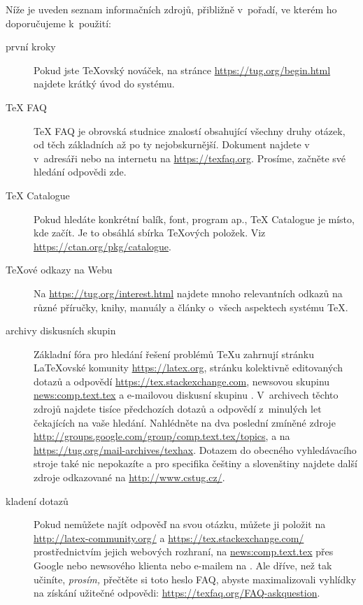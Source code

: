 \documentclass[\classoptions,slovak,english,czech]{\classname}
\newcommand{\ctt}{\url{news:comp.text.tex}}
\begin{document}
Níže je uveden seznam informačních zdrojů, přibližně v~pořadí, ve kterém
ho doporučujeme k~použití:
\begin{description}
\item [první kroky] Pokud jste \TeX ovský nováček, na stránce
\url{https://tug.org/begin.html} najdete krátký úvod do systému.
\item [\TeX{} FAQ] \TeX{} FAQ je obrovská studnice
  znalostí obsahující všechny druhy otázek, od těch základních až po 
  ty nejobskurnější. Dokument najdete v~\TL{} v~adresáři 
  nebo na internetu na \url{https://texfaq.org}.
  Prosíme, začněte své hledání odpovědi zde.

\item [\TeX{} Catalogue] Pokud hledáte konkrétní balík,
  font, program ap., \TeX{} Catalogue je místo, kde začít.
  Je to obsáhlá sbírka \TeX{}ových položek. Viz
  \url{https://ctan.org/pkg/catalogue}.


\item [\TeX{}ové odkazy na Webu] Na \url{https://tug.org/interest.html}
  najdete mnoho relevantních odkazů na různé příručky,
  knihy, manuály a články o~všech aspektech systému \TeX{}.

\item [archivy diskusních skupin]
  Základní fóra pro hledání řešení problémů \TeX{}u zahrnují 
  stránku \LaTeX{}ovské komunity \url{https://latex.org}, 
  stránku kolektivně editovaných dotazů a odpovědí \url{https://tex.stackexchange.com},
  newsovou skupinu \ctt{} a e-mailovou diskusní
  skupinu . V~archivech těchto zdrojů
  najdete tisíce předchozích dotazů a odpovědí z~minulých let čekajících na vaše
  hledání. Nahlédněte na dva poslední zmíněné zdroje
  \url{http://groups.google.com/group/comp.text.tex/topics}, a na
  \url{https://tug.org/mail-archives/texhax}. Dotazem do obecného
  vyhledávacího stroje %
  také nic nepokazíte
  a pro specifika češtiny a slovenštiny najdete další zdroje
  odkazované na \url{http://www.cstug.cz/}.
  
\item [kladení dotazů] Pokud nemůžete najít odpověď na svou otázku,
  můžete ji položit na \url{http://latex-community.org/} a
  \url{https://tex.stackexchange.com/} prostřednictvím jejich webových rozhraní, 
  na \ctt{} přes Google nebo newsového klienta nebo e-mailem na .
  Ale dříve, než tak učiníte, \emph{prosím,} přečtěte si toto heslo FAQ,
  abyste maximalizovali vyhlídky na získání užitečné odpovědi:
  \url{https://texfaq.org/FAQ-askquestion}.


\end{description}
\end{document}
